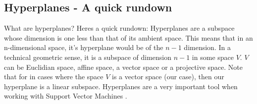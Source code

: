 \documentclass{article}
\begin{document}
\subsection{Hyperplanes - A quick rundown} \label{hyperp}
What are hyperplanes? Heres a quick rundown:
\newline Hyperplanes are a subspace whose dimension is one less than that of its ambient space. This means that in an n-dimensional space, it's hyperplane would be of the $n-1$ dimension. \newline
In a technical geometric sense, it is a subspace of dimension $n-1$ in some space $V$. $V$ can be Euclidian space, affine space, a vector space or a projective space. \newline
Note that for in cases where the space $V$ is a vector space (our case), then our hyperplane is a linear subspace.
\newline Hyperplanes are a very important tool when working with Support Vector Machines \cite{hplanes}.
\end{document}
